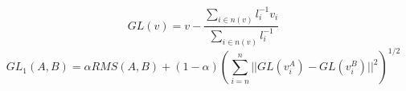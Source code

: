 \begin{equation}
GL(v)= v-\frac{\sum_{i \in n(v)}{l_i^{-1}v_i}}{\sum_{i \in n(v)}{l_i^{-1}}}
\end{equation}
\begin{equation}
GL_1(A,B)= \alpha RMS(A,B) + (1- \alpha)(\sum_{i=n}^n{||GL(v_i^A)-GL(v_i^B)||^2})^{1/2}
\end{equation}